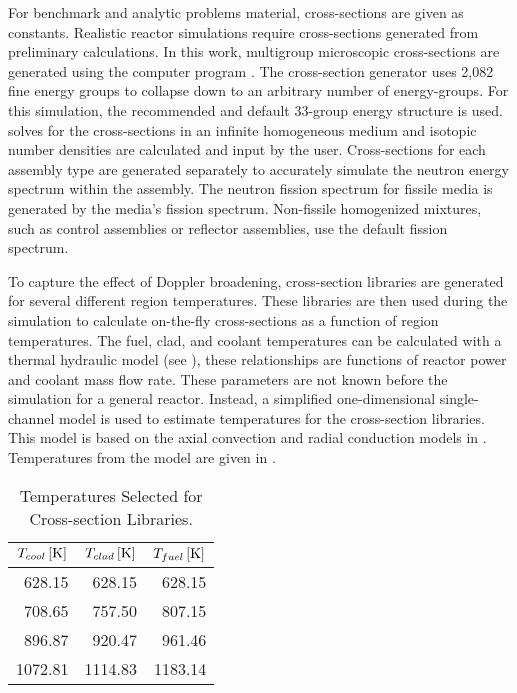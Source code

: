   For benchmark and analytic problems material, cross-sections are given as
  constants. Realistic reactor simulations require
  cross-sections generated from preliminary calculations. In this
  work, multigroup microscopic cross-sections are generated using the computer
  program \mcc \cite{mcc}.
  The cross-section generator uses 2,082 fine energy groups to collapse down
  to an arbitrary number of energy-groups. For this simulation, the
  recommended and default 33-group energy structure is used. \mcc 
  solves for the cross-sections in an infinite homogeneous medium and isotopic 
  number densities are calculated and input by the user.
  Cross-sections for each assembly type are generated separately to accurately
  simulate the neutron energy spectrum within the assembly. The neutron fission  
  spectrum for fissile media is generated by the media's fission spectrum. 
  Non-fissile homogenized mixtures, such as control assemblies or reflector
  assemblies, use the default  fission spectrum. 

  To capture the effect of Doppler broadening, cross-section libraries are
  generated for several different region temperatures. These libraries are
  then used during the simulation to calculate on-the-fly cross-sections as a
  function of region temperatures.
  The fuel, clad, and coolant temperatures can be calculated with a thermal
  hydraulic model (see ), these relationships are 
  functions of reactor power and coolant mass flow rate. These parameters are
  not known before the simulation for a general reactor. Instead, a simplified
  one-dimensional single-channel model is used to estimate temperatures for the
  cross-section libraries. This model is based on the axial convection and
  radial conduction models in . Temperatures from
  the model are given in .

  \begin{table}
    \caption{Temperatures Selected for Cross-section Libraries.}
    \label{tab:xstemps}
    \begin{center}
      \begin{tabular}{rrr}
        \toprule
        $T_{cool} \left[\text{{K}}\right]$ & $T_{clad} \left[\text{{K}}\right]$ & $T_{fuel} \left[\text{{K}}\right]$ \\
        \midrule
        628.15 & 628.15 & 628.15  \\
        708.65 & 757.50 & 807.15  \\
        896.87 & 920.47 & 961.46 \\
        1072.81 & 1114.83 & 1183.14 \\
        \bottomrule
      \end{tabular}
    \end{center}
  \end{table}

